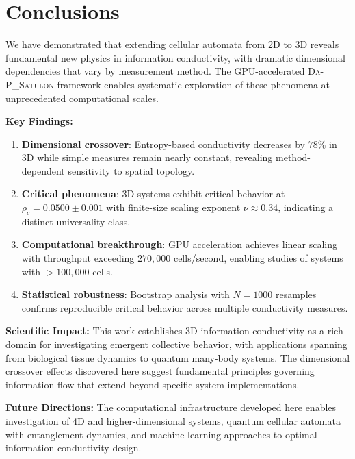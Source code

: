 \documentclass[twocolumn,showpacs,preprintnumbers,amsmath,amssymb,prb]{revtex4-2}
\newcommand{\satulon}{\textsc{Da-P\_Satulon}}
\begin{document}




\section{Conclusions}
\label{sec:conclusions}

We have demonstrated that extending cellular automata from 2D to 3D reveals fundamental new physics in information conductivity, with dramatic dimensional dependencies that vary by measurement method. The GPU-accelerated \satulon{} framework enables systematic exploration of these phenomena at unprecedented computational scales.

\textbf{Key Findings:}
\begin{enumerate}
\item \textbf{Dimensional crossover}: Entropy-based conductivity decreases by $78\%$ in 3D while simple measures remain nearly constant, revealing method-dependent sensitivity to spatial topology.

\item \textbf{Critical phenomena}: 3D systems exhibit critical behavior at $\rho_c = 0.0500 \pm 0.001$ with finite-size scaling exponent $\nu \approx 0.34$, indicating a distinct universality class.

\item \textbf{Computational breakthrough}: GPU acceleration achieves linear scaling with throughput exceeding $270,000$ cells/second, enabling studies of systems with $>100,000$ cells.

\item \textbf{Statistical robustness}: Bootstrap analysis with $N=1000$ resamples confirms reproducible critical behavior across multiple conductivity measures.
\end{enumerate}

\textbf{Scientific Impact:} This work establishes 3D information conductivity as a rich domain for investigating emergent collective behavior, with applications spanning from biological tissue dynamics to quantum many-body systems. The dimensional crossover effects discovered here suggest fundamental principles governing information flow that extend beyond specific system implementations.

\textbf{Future Directions:} The computational infrastructure developed here enables investigation of 4D and higher-dimensional systems, quantum cellular automata with entanglement dynamics, and machine learning approaches to optimal information conductivity design.
\end{document}
